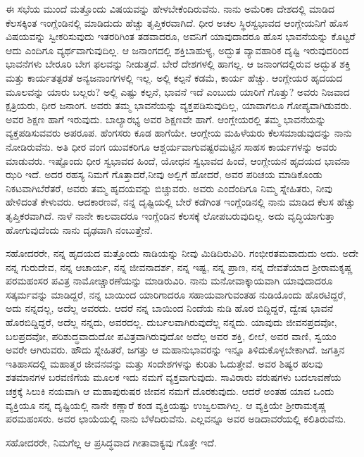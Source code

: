 ಈ ಸಭೆಯ ಮುಂದೆ ಮತ್ತೊಂದು ವಿಷಯವನ್ನು ಹೇಳಬೇಕೆಂದಿರುವೆನು. ನಾನು ಅಮೆರಿಕಾ ದೇಶದಲ್ಲಿ ಮಾಡಿದ ಕೆಲಸಕ್ಕಿಂತ ಇಂಗ್ಲೆಂಡಿನಲ್ಲಿ ಮಾಡಿದುದು ಹೆಚ್ಚು ತೃಪ್ತಿಕರವಾಗಿದೆ. ಧೀರ ಅಚಲ ಸ್ಥಿರಸ್ವಭಾವದ ಆಂಗ್ಲೇಯನಿಗೆ ಹೊಸ ವಿಷಯವನ್ನು ಸ್ವೀಕರಿಸುವುದು ಇತರರಿಗಿಂತ ತಡವಾದರೂ, ಅವನಿಗೆ ಯಾವುದಾದರೂ ಹೊಸ ಭಾವನೆಯನ್ನು ಕೊಟ್ಟರೆ ಆದು ಎಂದಿಗೂ ವ್ಯರ್ಥವಾಗುವುದಿಲ್ಲ. ಆ ಜನಾಂಗದಲ್ಲಿ ಶಕ್ತಿಬಾಹುಳ್ಯ, ಅದ್ಭುತ ವ್ಯಾವಹಾರಿಕ ದೃಷ್ಟಿ ಇರುವುದರಿಂದ ಭಾವನೆಗಳು ಬೇರೂರಿ ಬೇಗ ಫಲವನ್ನು ನೀಡುತ್ತದೆ. ಬೇರೆ ದೇಶಗಳಲ್ಲಿ ಹಾಗಲ್ಲ. ಆ ಜನಾಂಗದಲ್ಲಿರುವ ಅದ್ಭುತ ಶಕ್ತಿ ಮತ್ತು ಕಾರ್ಯತತ್ಪರತೆ ಅನ್ಯಜನಾಂಗಗಳಲ್ಲಿ ಇಲ್ಲ. ಅಲ್ಲಿ ಕಲ್ಪನೆ ಕಡಮೆ, ಕಾರ್ಯ ಹೆಚ್ಚು. ಆಂಗ್ಲೇಯರ ಹೃದಯದ ಮೂಲವನ್ನು ಯಾರು ಬಲ್ಲರು? ಅಲ್ಲಿ ಎಷ್ಟು ಕಲ್ಪನೆ, ಭಾವನೆ ಇದೆ ಎಂಬುದು ಯಾರಿಗೆ ಗೊತ್ತು? ಅವರು ನಿಜವಾದ ಕ್ಷತ್ರಿಯರು, ಧೀರ ಜನಾಂಗ. ಅವರು ತಮ್ಮ ಭಾವನೆಯನ್ನು ವ್ಯಕ್ತಪಡಿಸುವುದಿಲ್ಲ, ಯಾವಾಗಲೂ ಗೋಪ್ಯವಾಗಿಡುವರು. ಅವರ ಶಿಕ್ಷಣ ಹಾಗೆ ಇರುವುದು. ಬಾಲ್ಯಾರಭ್ಯ ಅವರ ಶಿಕ್ಷಣವೇ ಹಾಗೆ. ಆಂಗ್ಲೇಯರಲ್ಲಿ ತಮ್ಮ ಭಾವನೆಯನ್ನು ವ್ಯಕ್ತಪಡಿಸುವವರು ಅಪರೂಪ. ಹೆಂಗಸರು ಕೂಡ ಹಾಗೆಯೇ. ಆಂಗ್ಲೇಯ ಮಹಿಳೆಯರು ಕೆಲಸಮಾಡುವುದನ್ನು ನಾನು ನೋಡಿರುವೆನು. ಅತಿ ಧೀರ ವಂಗ ಯುವಕರಿಗೂ ಆಶ್ಚರ್ಯವಾಗುವಷ್ಟರಮಟ್ಟಿನ ಸಾಹಸ ಕಾರ್ಯಗಳನ್ನು ಅವರು ಮಾಡುವರು. ಇಷ್ಟೊಂದು ಧೀರ ಸ್ವಭಾವದ ಹಿಂದೆ, ಯೋಧನ ಸ್ವಭಾವದ ಹಿಂದೆ, ಆಂಗ್ಲೇಯನ ಹೃದಯದ ಭಾವನಾ ಝರಿ ಇದೆ. ಅದರ ರಹಸ್ಯ ನಿಮಗೆ ಗೊತ್ತಾದರೆ,\break ನೀವು ಅಲ್ಲಿಗೆ ಹೋದರೆ, ಅವರ ಪರಿಚಯ ಮಾಡಿಕೊಂಡು ನಿಕಟವಾಗಿ\break ಬೆರೆತರೆ, ಅವರು ತಮ್ಮ ಹೃದಯವನ್ನು ಬಿಚ್ಚುವರು. ಅವರು ಎಂದೆಂದಿಗೂ ನಿಮ್ಮ ಸ್ನೇಹಿತರು, ನೀವು ಹೇಳಿದಂತೆ ಕೇಳುವರು. ಆದಕಾರಣವೆ, ನನ್ನ ದೃಷ್ಟಿಯಲ್ಲಿ ಬೇರೆ ಕಡೆಗಿಂತ ಇಂಗ್ಲೆಂಡಿನಲ್ಲಿ ನಾನು ಮಾಡಿದ ಕೆಲಸ ಹೆಚ್ಚು ತೃಪ್ತಿಕರವಾಗಿದೆ. ನಾಳೆ ನಾನೇ ಕಾಲವಾದರೂ ಇಂಗ್ಲೆಂಡಿನ ಕೆಲಸಕ್ಕೆ ಲೋಪಬರುವುದಿಲ್ಲ. ಅದು ವೃದ್ಧಿಯಾಗುತ್ತಾ ಹೋಗುವುದೆಂದು ನಾನು ದೃಢವಾಗಿ ನಂಬುತ್ತೇನೆ.

ಸಹೋದರರೇ, ನನ್ನ ಹೃದಯದ ಮತ್ತೊಂದು ನಾಡಿಯನ್ನು ನೀವು ಮಿಡಿದಿರುವಿರಿ. ಗಂಭೀರತಮವಾದುದು ಅದು. ಅದೇ ನನ್ನ ಗುರುದೇವ, ನನ್ನ ಆಚಾರ್ಯ, ನನ್ನ ಜೀವನಾದರ್ಶ, ನನ್ನ ಇಷ್ಟ, ನನ್ನ ಪ್ರಾಣ, ನನ್ನ ದೇವತೆಯಾದ ಶ‍್ರೀರಾಮಕೃಷ್ಣ ಪರಮಹಂಸರ ಪವಿತ್ರ ನಾಮೋಚ್ಚಾರಣೆಯನ್ನು ಮಾಡಿರುವಿರಿ. ನಾನು ಮನೋವಾಕ್ಕಾಯವಾಗಿ ಯಾವುದಾದರೂ ಸತ್ಕರ್ಮವನ್ನು ಮಾಡಿದ್ದರೆ, ನನ್ನ ಬಾಯಿಂದ ಯಾರಿಗಾದರೂ ಸಹಾಯವಾಗುವಂತಹ ನುಡಿಯೊಂದು ಹೊರಟಿದ್ದರೆ, ಅದು ನನ್ನದಲ್ಲ, ಅದೆಲ್ಲ ಅವರದು. ಆದರೆ ನನ್ನ ಬಾಯಿಂದ ನಿಂದೆಯ ನುಡಿ ಹೊರ ಬಿದ್ದಿದ್ದರೆ, ದ್ವೇಷ ಭಾವನೆ ಹೊರಬಿದ್ದಿದ್ದರೆ, ಅದೆಲ್ಲ ನನ್ನದು, ಅವರದಲ್ಲ. ದುರ್ಬಲವಾಗಿರುವುದೆಲ್ಲ ನನ್ನದು. ಯಾವುದು ಜೀವನಪ್ರದವೋ, ಬಲಪ್ರದವೋ, ಪರಿಶುದ್ಧವಾದುದೋ ಪವಿತ್ರವಾಗಿರುವುದೋ ಅದೆಲ್ಲ ಅವರ ಶಕ್ತಿ, ಲೀಲೆ, ಅವರ ವಾಣಿ, ಸ್ವಯಂ ಅವರೇ ಆಗಿರುವರು. ಹೌದು ಸ್ನೇಹಿತರೆ, ಜಗತ್ತು ಆ ಮಹಾನುಭಾವರನ್ನು ಇನ್ನೂ ತಿಳಿದುಕೊಳ್ಳಬೇಕಾಗಿದೆ. ಜಗತ್ತಿನ ಇತಿಹಾಸದಲ್ಲಿ ಮಹಾತ್ಮರ ಜೀವನವನ್ನು ಮತ್ತು ಸಂದೇಶಗಳನ್ನು ಕುರಿತು ಓದುತ್ತೇವೆ. ಅವರ ಶಿಷ್ಯರ ಹಲವು ಶತಮಾನಗಳ ಬರವಣಿಗೆಯ ಮೂಲಕ ಇದು ನಮಗೆ ವ್ಯಕ್ತವಾಗುವುದು. ಸಾವಿರಾರು ವರುಷಗಳು ಬದಲಾವಣೆಯ ಚಕ್ರಕ್ಕೆ ಸಿಲುಕಿ ನಯವಾಗಿ ಆ ಮಹಾಪುರುಷರ ಜೀವನ ನಮಗೆ ದೊರಕುವುದು. ಆದರೆ ಅಂತಹ ಯಾವ ಒಂದು ವ್ಯಕ್ತಿಯೂ ನನ್ನ ದೃಷ್ಟಿಯಲ್ಲಿ ನಾನೇ ಕಣ್ಣಾರೆ ಕಂಡ ವ್ಯಕ್ತಿಯಷ್ಟು ಉಜ್ವಲವಾಗಿಲ್ಲ. ಆ ವ್ಯಕ್ತಿಯೇ ಶ‍್ರೀರಾಮಕೃಷ್ಣ ಪರಮಹಂಸರು. ಅವರ ಛಾಯೆಯಲ್ಲಿ ನಾನು ಬೆಳೆದಿರುವೆನು. ಎಲ್ಲವನ್ನೂ ಅವರ ಅಡಿದಾವರೆಯಲ್ಲಿ ಕಲಿತಿರುವೆನು.

ಸಹೋದರರೇ, ನಿಮಗೆಲ್ಲ ಆ ಪ್ರಸಿದ್ಧವಾದ ಗೀತಾವಾಕ್ಯವು ಗೊತ್ತೇ ಇದೆ.

